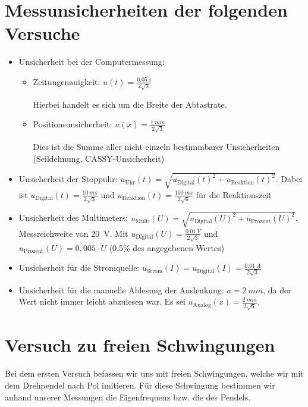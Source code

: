 \documentclass[11pt,a4paper,titlepage, ngerman]{article}
\begin{document}
	\section{Messunsicherheiten der folgenden Versuche}
		
		\begin{itemize}
			\item Unsicherheit bei der Computermessung: 
			\begin{itemize}
				\item Zeitungenauigkeit: $u(t) = \frac{\SI{0,05}{\second}}{2\sqrt{3}}$
				
				Hierbei handelt es sich um die Breite der Abtastrate.
				
				\item Positionsunsicherheit: $u(x) = \frac{\SI{1}{mm}}{2\sqrt{3}}$
				
				Dies ist die Summe aller nicht einzeln bestimmbarer Unsicherheiten (Seildehnung, CASSY-Unsicherheit)			
			\end{itemize}
			\item Unsicherheit der Stoppuhr:
			$u_\text{Uhr}(t) = \sqrt{u_\text{Digital}(t)^2 + u_\text{Reaktion}(t)^2}$.
			Dabei ist $u_\text{Digital}(t) = \frac{\SI{10}{ms}}{2\sqrt{3}}$ und $u_\text{Reaktion}(t) = \frac{\SI{100}{ms}}{2\sqrt{6}}$ für die Reaktionszeit
			\item Unsicherheit des Multimeters: 
			$u_\text{Multi}(U) = \sqrt{u_\text{Digital}(U)^2 + u_\text{Prozent}(U)^2}$.
			Messreichweite von \SI{20}{V}.
			Mit $u_\text{Digital}(U) = \frac{\SI{0,01}{V}}{2\sqrt{3}}$ und $u_\text{Prozent}(U) = 0,005 \cdot U$  (0.5\% des angegebenen Wertes)
			\item Unsicherheit für die Stromquelle: 
			$u_\text{Strom}(I) = u_\text{Digital}(I) = \frac{\SI{0,01}{A}}{2\sqrt{3}}$
			\item Unsicherheit für die manuelle Ablesung der Auslenkung: 
			$a = \SI{2}{mm}$, da der Wert nicht immer leicht abzulesen war.		
			Es sei $u_\text{Analog}(x) = \frac{\SI{2}{mm}}{2\sqrt{6}}$.
		\end{itemize}
	
	\section{Versuch zu freien Schwingungen}
		
		Bei dem ersten Versuch befassen wir uns mit freien Schwingungen, welche wir mit dem Drehpendel nach Pol imitieren. Für diese Schwingung bestimmen wir anhand unserer Messungen die Eigenfrequenz bzw. die des Pendels.
		
\end{document}
